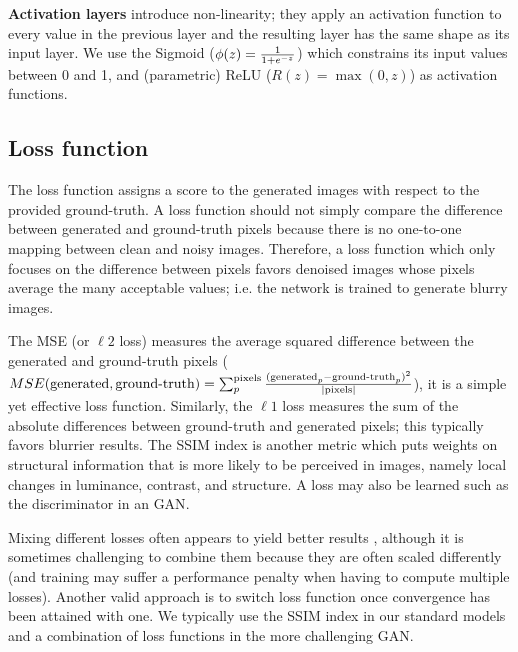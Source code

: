 \textbf{Activation layers} introduce non-linearity; they apply an activation function to every value in the previous layer and the resulting layer has the same shape as its input layer. We use the Sigmoid ($\phi(z)={1\over{1+e^{-z}}}$) which constrains its input values between 0 and 1, and (parametric) \ac{ReLU} ($R(z)=\max(0,z)$) as activation functions. 


\subsection{Loss function}
The loss function assigns a score to the generated images with respect to the provided ground-truth. A loss function should not simply compare the difference between generated and ground-truth pixels because there is no one-to-one mapping between clean and noisy images. Therefore, a loss function which only focuses on the difference between pixels favors denoised images whose pixels average the many acceptable values; i.e. the network is trained to generate blurry images. \cite{pix2pix}

The \ac{MSE} (or $\ell 2$ loss) measures the average squared difference between the generated and ground-truth pixels \newline($MSE(\text{generated}, \text{ground-truth})=\sum_p^\text{pixels}{(\text{generated}_p-\text{ground-truth}_p)^2\over{|\text{pixels}|}}$), it is a simple yet effective loss function. Similarly, the $\ell 1$ loss measures the sum of the absolute differences between ground-truth and generated pixels; this typically favors blurrier results. The \ac{SSIM} index is another metric which puts weights on structural information that is more likely to be perceived in images, namely local changes in luminance, contrast, and structure. A loss may also be learned such as the discriminator in an \acl{GAN}.

Mixing different losses often appears to yield better results \cite{lossescomp}, although it is sometimes challenging to combine them because they are often scaled differently (and training may suffer a performance penalty when having to compute multiple losses). Another valid approach is to switch loss function once convergence has been attained with one. \cite{lossescomp} We typically use the \ac{SSIM} index in our standard models and a combination of loss functions in the more challenging \ac{GAN}.


